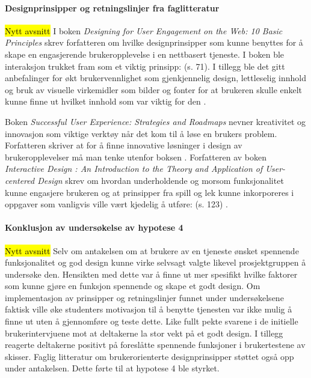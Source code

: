 \paragraph{Designprinsipper og retningslinjer fra faglitteratur}
\hl{Nytt avsnitt}
I boken {\em Designing for User Engagement on the Web: 10 Basic Principles} skrev forfatteren om hvilke designprinsipper som kunne benyttes for å skape en engasjerende brukeropplevelse i en nettbasert tjeneste. I boken ble interaksjon trukket fram som et viktig prinsipp:  (s. 71). I tillegg ble det gitt anbefalinger for økt brukervennlighet som gjenkjennelig design, lettleselig innhold og bruk av visuelle virkemidler som bilder og fonter for at brukeren skulle enkelt kunne finne ut hvilket innhold som var viktig for den \cite{ENGAGEMENT-WEB:17}. 

Boken {\em Successful User Experience: Strategies and Roadmaps} nevner kreativitet og innovasjon som viktige verktøy når det kom til å løse en brukers problem. Forfatteren skriver at for å finne innovative løsninger i design av brukeropplevelser må man tenke utenfor boksen \cite{SUCCESSFUL-UX:18}. Forfatteren av boken {\em Interactive Design : An Introduction to the Theory and Application of User-centered Design} skrev om hvordan underholdende og morsom funksjonalitet kunne engasjere brukeren og at prinsipper fra spill og lek kunne inkorporeres i oppgaver som vanligvis ville vært kjedelig å utføre:  (s. 123) \cite{INTERACTIVE-DESIGN:19}.

\paragraph{Konklusjon av undersøkelse av hypotese 4}
\hl{Nytt avsnitt}
Selv om antakelsen om at brukere av en tjeneste ønsket spennende funksjonalitet og god design kunne virke selvsagt valgte likevel prosjektgruppen å undersøke den. Hensikten med dette var å finne ut mer spesifikt hvilke faktorer som kunne gjøre en funksjon spennende og skape et godt design. Om implementasjon av prinsipper og retningslinjer funnet under undersøkelsene faktisk ville øke studenters motivasjon til å benytte tjenesten var ikke mulig å finne ut uten å gjennomføre og teste dette. Like fullt pekte svarene i de initielle brukerintervjuene mot at deltakerne la stor vekt på et godt design. I tillegg reagerte deltakerne positivt på foreslåtte spennende funksjoner i brukertestene av skisser. Faglig litteratur om brukerorienterte designprinsipper støttet også opp under antakelsen. Dette førte til at hypotese 4 ble styrket.


